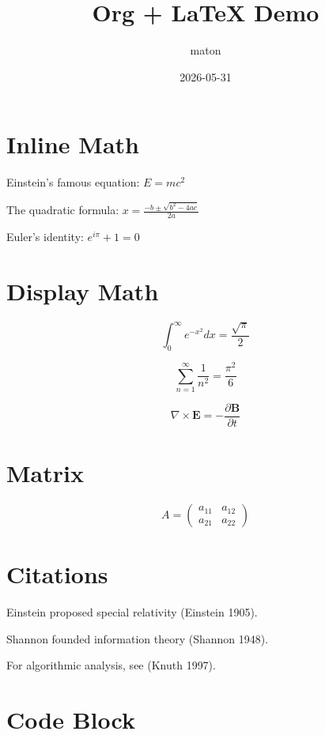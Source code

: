 \documentclass[11pt]{article}
\author{maton}
\date{2026-05-31}
\title{Org + \LaTeX{} Demo}
\begin{document}
\maketitle
\tableofcontents


\section{Inline Math}
\label{sec:orgf06e628}

Einstein's famous equation: \(E = mc^2\)

The quadratic formula: \(x = \frac{-b \pm \sqrt{b^2 - 4ac}}{2a}\)

Euler's identity: \(e^{i\pi} + 1 = 0\)

\section{Display Math}
\label{sec:org270e00a}

\[ \int_0^\infty e^{-x^2} dx = \frac{\sqrt{\pi}}{2} \]

\[ \sum_{n=1}^{\infty} \frac{1}{n^2} = \frac{\pi^2}{6} \]

\begin{equation}
	\nabla \times \mathbf{E} = -\frac{\partial \mathbf{B}}{\partial t}
\end{equation}

\section{Matrix}
\label{sec:orgbe4e020}

\[
	A = \begin{pmatrix}
		a_{11} & a_{12} \\
		a_{21} & a_{22}
	\end{pmatrix}
\]

\section{Citations}
\label{sec:org976ba7e}

Einstein proposed special relativity (Einstein 1905).

Shannon founded information theory (Shannon 1948).

For algorithmic analysis, see (Knuth 1997).

\section{Code Block}
\label{sec:orge624672}
\end{document}
